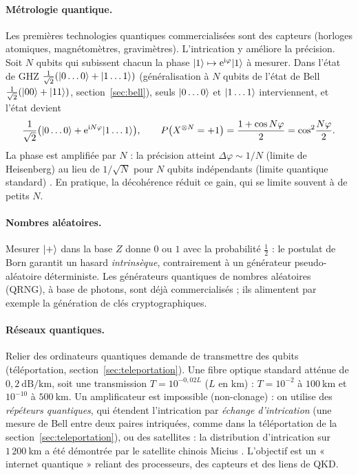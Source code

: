 \paragraph{Métrologie quantique.} Les premières technologies quantiques commercialisées sont des capteurs (horloges atomiques,
magnétomètres, gravimètres). L'intrication y améliore la précision. Soit $N$ qubits qui subissent chacun la phase
$|1\rangle\mapsto\mathrm{e}^{\mathrm{i}\varphi}|1\rangle$ à mesurer. Dans l'état de GHZ $\frac{1}{\sqrt2}(|0\ldots0\rangle+|1\ldots1\rangle)$ (généralisation à $N$ qubits de l'état de Bell
$\frac{1}{\sqrt2}(|00\rangle+|11\rangle)$, section~\ref{sec:bell}), seuls $|0\ldots0\rangle$ et $|1\ldots1\rangle$ interviennent, et l'état devient
\[
  \frac{1}{\sqrt2}\big(|0\ldots0\rangle+\mathrm{e}^{\mathrm{i} N\varphi}|1\ldots1\rangle\big),\qquad
  P\big(X^{\otimes N}=+1\big)=\frac{1+\cos N\varphi}{2}=\cos^2\!\frac{N\varphi}{2}.
\]
La phase est amplifiée par $N$ : la précision atteint $\Delta\varphi\sim1/N$ (limite de Heisenberg) au lieu de $1/\sqrt N$ pour
$N$ qubits indépendants (limite quantique standard) \parencite{giovannetti2004}. En pratique, la décohérence réduit ce gain, qui
se limite souvent à de petits $N$.

\paragraph{Nombres aléatoires.} Mesurer $|+\rangle$ dans la base $Z$ donne $0$ ou $1$ avec la probabilité $\frac12$ : le postulat de Born
garantit un hasard \emph{intrinsèque}, contrairement à un générateur pseudo-aléatoire déterministe. Les générateurs quantiques
de nombres aléatoires (QRNG), à base de photons, sont déjà commercialisés ; ils alimentent par exemple la génération de clés cryptographiques.

\paragraph{Réseaux quantiques.} Relier des ordinateurs quantiques demande de transmettre des qubits (téléportation, section~\ref{sec:teleportation}).
Une fibre optique standard atténue de $0{,}2\ \mathrm{dB/km}$, soit une transmission $T=10^{-0{,}02L}$ ($L$ en km) :
$T=10^{-2}$ à $100\ \mathrm{km}$ et $10^{-10}$ à $500\ \mathrm{km}$. Un amplificateur est impossible (non-clonage) : on utilise des
\emph{répéteurs quantiques}, qui étendent l'intrication par \emph{échange d'intrication} (une mesure de Bell entre deux paires intriquées, comme dans la
téléportation de la section~\ref{sec:teleportation}), ou des satellites : la distribution
d'intrication sur $1\,200\ \mathrm{km}$ a été démontrée par le satellite chinois Micius \parencite{yin2017}. L'objectif est un « internet
quantique » \parencite{wehner2018} reliant des processeurs, des capteurs et des liens de QKD.

